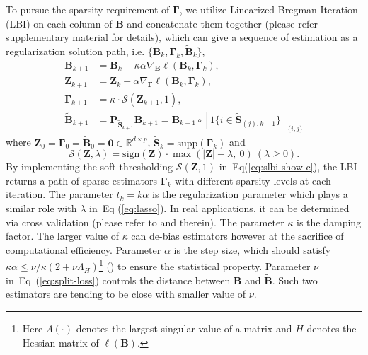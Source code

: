 \documentclass{article}
\begin{document}
To pursue the sparsity requirement of $\mathbf{\Gamma}$, we utilize
Linearized Bregman Iteration (LBI) on each column of $\mathbf{B}$
and concatenate them together (please refer supplementary material
for details), which can give a sequence of estimation as a regularization
solution path, i.e. $\{\mathbf{B}_{k},\mathbf{\Gamma}_{k},\widetilde{\mathbf{B}}_{k}\}$,
\begin{subequations} \label{eq:slbi-show}
\begin{align}
\mathbf{B}_{k+1} & =\mathbf{B}_{k}-\kappa\alpha\nabla_{\mathbf{B}}\ell(\mathbf{B}_{k},\mathbf{\Gamma}_{k}),\label{eq:slbi-show-a}\\
\mathbf{Z}_{k+1} & =\mathbf{Z}_{k}-\alpha\nabla_{\mathbf{\Gamma}}\ell(\mathbf{B}_{k},\mathbf{\Gamma}_{k}),\label{eq:slbi-show-b}\\
\mathbf{\Gamma}_{k+1} & =\kappa\cdot\mathcal{S}\left(\mathbf{Z}_{k+1},1\right),\label{eq:slbi-show-c}\\
\widetilde{\mathbf{B}}_{k+1} & =\mathrm{\mathbf{P}}_{\widetilde{\mathbf{S}}_{k+1}}\mathbf{B}_{k+1}=\mathbf{B}_{k+1}\circ\left[1\{i\in\widetilde{\mathbf{S}}_{(j),k+1}\}\right]_{\{i,j\}}\label{eq:slbi-show-d}
\end{align}
\end{subequations}
\noindent where $\mathbf{Z}_{0}=\mathbf{\Gamma}_{0}=\widetilde{\mathbf{B}}_{0}=\mathbf{0}\in\mathbb{R}^{d\times p}$,
$\widetilde{\mathbf{S}}_{k}=\mathrm{supp}(\mathbf{\Gamma}_{k})$ and
\[
\mathcal{S}\left(\mathbf{Z},\lambda\right)=\mathrm{sign}(\mathbf{Z})\cdot\max\left(|\mathbf{Z}|-\lambda,\ 0\right)\ (\lambda\geq0).
\]
By implementing the soft-thresholding $\mathcal{S}\left(\mathbf{Z},1\right)$
in~Eq(\ref{eq:slbi-show-c}), the LBI returns a path of sparse estimators
$\mathbf{\Gamma}_{k}$ with different sparsity levels at each iteration.
The parameter $t_{k}=k\alpha$ is the regularization parameter which
plays a similar role with $\lambda$ in~Eq (\ref{eq:lasso}). In
real applications, it can be determined via cross validation (please
refer to \citet{bregman} and therein). The parameter $\kappa$ is
the damping factor. The larger value of $\kappa$ can de-bias estimators
however at the sacrifice of computational efficiency. Parameter $\alpha$
is the step size, which should satisfy $\kappa\alpha\leq\nu/\kappa(2+\nu\Lambda_{H})$\footnote{Here $\Lambda(\cdot)$ denotes the largest singular value of a matrix
and $H$ denotes the Hessian matrix of $\ell(\mathbf{B})$.} (\citet{Splitlbi}) to ensure the statistical property. Parameter
$\nu$ in~Eq~(\ref{eq:split-loss}) controls the distance between
$\mathbf{B}$ and $\tilde{\mathbf{B}}$. Such two estimators are tending
to be close with smaller value of $\nu$.
\end{document}
